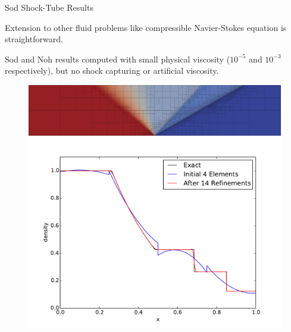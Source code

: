 \documentclass[final]{beamer}
\newlength{\onecolwid}
\begin{document}
\begin{frame}[t]
\begin{columns}[t]
\begin{column}{\onecolwid}
\begin{block}{Sod Shock-Tube Results}

Extension to other fluid problems like compressible Navier-Stokes
equation is straightforward. 

Sod and Noh results computed with small physical viscosity ($10^{-5}$ and $10^{-3}$ respectively), 
but no shock capturing or artificial viscosity.
\begin{figure}
\includegraphics[width=\linewidth]{Sod/MinNSDecoupled1e-5/mesh15.png}\\
\includegraphics[width=0.8\linewidth]{figs/SodComparison.pdf}\\
\end{figure}
\end{block}


\end{column}
\end{columns}
\end{frame}
\end{document}
